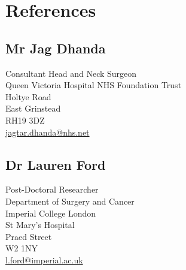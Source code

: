 \section*{References}

\subsection*{Mr Jag Dhanda} 
Consultant Head and Neck Surgeon \\
Queen Victoria Hospital NHS Foundation Trust \\
Holtye Road \\
East Grinstead \\
RH19 3DZ \\

\url{jagtar.dhanda@nhs.net}

\subsection*{Dr Lauren Ford} 
Post-Doctoral Researcher \\
Department of Surgery and Cancer \\
Imperial College London \\
St Mary's Hospital \\
Praed Street \\
W2 1NY \\

\url{l.ford@imperial.ac.uk}
